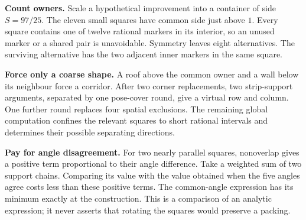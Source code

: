 \documentclass[11pt]{article}
\begin{document}
\textbf{Count owners.} Scale a hypothetical improvement into a container
of side $S=97/25$. The eleven small squares have common side just above
$1$. Every square contains one of twelve rational markers in its interior,
so an unused marker or a shared pair is unavoidable. Symmetry leaves
eight alternatives. The surviving alternative has the two adjacent inner
markers in the same square.

\textbf{Force only a coarse shape.} A roof above the common owner and a
wall below its neighbour force a corridor. After two corner replacements,
two strip-support arguments, separated by one pose-cover round, give a
virtual row and column. One further round replaces four spatial exclusions.
The remaining global computation confines the relevant squares to short
rational intervals and determines their possible separating directions.

\textbf{Pay for angle disagreement.} For two nearly parallel squares,
nonoverlap gives a positive term proportional to their angle difference.
Take a weighted sum of two support chains. Comparing its value with the
value obtained when the five angles agree costs less than these positive
terms. The common-angle expression has its minimum exactly at the
construction. This is a comparison of an analytic expression; it never
asserts that rotating the squares would preserve a packing.
\end{document}
